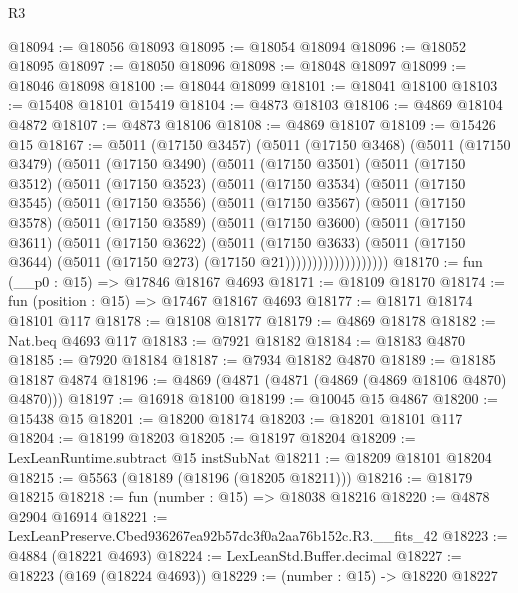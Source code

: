\begin{lexlean}{R3}
\begin{coremodule}
@18094 := @18056 @18093
@18095 := @18054 @18094
@18096 := @18052 @18095
@18097 := @18050 @18096
@18098 := @18048 @18097
@18099 := @18046 @18098
@18100 := @18044 @18099
@18101 := @18041 @18100
@18103 := @15408 @18101 @15419
@18104 := @4873 @18103
@18106 := @4869 @18104 @4872
@18107 := @4873 @18106
@18108 := @4869 @18107
@18109 := @15426 @15
@18167 := @5011
    (@17150 @3457)
    (@5011
      (@17150 @3468)
      (@5011
        (@17150 @3479)
        (@5011
          (@17150 @3490)
          (@5011
            (@17150 @3501)
            (@5011
              (@17150 @3512)
              (@5011
                (@17150 @3523)
                (@5011
                  (@17150 @3534)
                  (@5011
                    (@17150 @3545)
                    (@5011
                      (@17150 @3556)
                      (@5011
                        (@17150 @3567)
                        (@5011
                          (@17150 @3578)
                          (@5011
                            (@17150 @3589)
                            (@5011
                              (@17150 @3600)
                              (@5011
                                (@17150 @3611)
                                (@5011
                                  (@17150 @3622)
                                  (@5011
                                    (@17150 @3633)
                                    (@5011
                                      (@17150 @3644)
                                      (@5011 (@17150 @273) (@17150 @21)))))))))))))))))))
@18170 := fun (__p0 : @15) => @17846 @18167 @4693
@18171 := @18109 @18170
@18174 := fun (position : @15) => @17467 @18167 @4693
@18177 := @18171 @18174 @18101 @117
@18178 := @18108 @18177
@18179 := @4869 @18178
@18182 := Nat.beq @4693 @117
@18183 := @7921 @18182
@18184 := @18183 @4870
@18185 := @7920 @18184
@18187 := @7934 @18182 @4870
@18189 := @18185 @18187 @4874
@18196 := @4869 (@4871 (@4871 (@4869 (@4869 @18106 @4870) @4870)))
@18197 := @16918 @18100
@18199 := @10045 @15 @4867
@18200 := @15438 @15
@18201 := @18200 @18174
@18203 := @18201 @18101 @117
@18204 := @18199 @18203
@18205 := @18197 @18204
@18209 := LexLeanRuntime.subtract @15 instSubNat
@18211 := @18209 @18101 @18204
@18215 := @5563 (@18189 (@18196 (@18205 @18211)))
@18216 := @18179 @18215
@18218 := fun (number : @15) => @18038 @18216
@18220 := @4878 @2904 @16914
@18221 := LexLeanPreserve.Cbed936267ea92b57dc3f0a2aa76b152c.R3.__fits_42
@18223 := @4884 (@18221 @4693)
@18224 := LexLeanStd.Buffer.decimal
@18227 := @18223 (@169 (@18224 @4693))
@18229 := (number : @15) -> @18220 @18227

\end{coremodule}
\end{lexlean}
